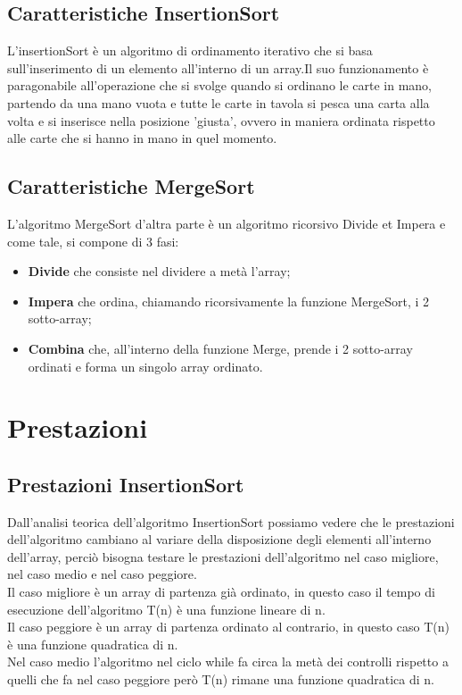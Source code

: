 \documentclass[12pt]{article}
\begin{document}
\subsection{Caratteristiche InsertionSort}
L'insertionSort è un algoritmo di ordinamento iterativo che si basa sull'inserimento di un elemento all'interno di un array.Il suo funzionamento è paragonabile all'operazione che si svolge quando si ordinano le carte in mano, partendo da una mano vuota e tutte le carte in tavola si pesca una carta alla volta e si inserisce nella posizione 'giusta', ovvero in maniera ordinata rispetto alle carte che si hanno in mano in quel momento. 
\subsection{Caratteristiche MergeSort}
L'algoritmo MergeSort d'altra parte è un algoritmo ricorsivo Divide et Impera e come tale, si compone di 3 fasi: 
\begin{itemize}
\item \textbf{Divide} che consiste nel dividere a metà l'array;
\item \textbf{Impera} che ordina, chiamando ricorsivamente la funzione MergeSort, i 2 sotto-array;
\item \textbf{Combina} che, all'interno della funzione Merge, prende i 2 sotto-array ordinati e forma un singolo array ordinato.
\end{itemize}
\section{Prestazioni}
\subsection{Prestazioni InsertionSort}
Dall'analisi teorica dell'algoritmo InsertionSort possiamo vedere che le prestazioni dell'algoritmo cambiano al variare della disposizione degli elementi all'interno dell'array, perciò bisogna testare le prestazioni dell'algoritmo nel caso migliore, nel caso medio e nel caso peggiore. 
\\Il caso migliore è un array di partenza già ordinato, in questo caso il tempo di esecuzione dell'algoritmo T(n) è una funzione lineare di n.
\\Il caso peggiore è un array di partenza ordinato al contrario, in questo caso T(n) è una funzione quadratica di n.
\\Nel caso medio l'algoritmo nel ciclo while fa circa la metà dei controlli rispetto a quelli che fa nel caso peggiore però T(n) rimane una funzione quadratica di n.
\end{document}
